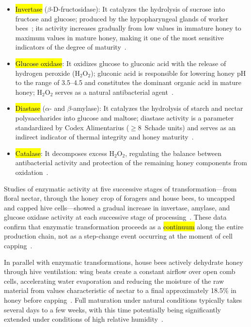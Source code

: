 \documentclass[foods,review,accept,pdftex,moreauthors]{Definitions/mdpi}
\begin{document}
\begin{itemize}
    \item \hl{Invertase} %
 ($\beta$-D-fructosidase): It catalyzes
          the hydrolysis of sucrose into fructose and glucose;
          produced by the hypopharyngeal glands of worker
          bees~\cite{biochemreactions2022};
          its activity increases gradually from low values
          in immature honey to maximum values in mature honey,
          making it one of the most sensitive indicators of
          the degree of maturity~\cite{zhang2021}.
    \item \hl{Glucose oxidase}: It oxidizes glucose to gluconic
          acid with the release of hydrogen peroxide (H$_2$O$_2$);
          gluconic acid is responsible for lowering honey pH to the
          range of 3.5--4.5 and constitutes the dominant organic
          acid in mature honey; H$_2$O$_2$ serves as a natural
          antibacterial agent~\cite{biochemreactions2022,zhang2021}.
    \item \hl{Diastase} 
 ($\alpha$- and $\beta$-amylase):
          It catalyzes the hydrolysis of starch and nectar
          polysaccharides into glucose and maltose; diastase
          activity is a parameter standardized by Codex Alimentarius
          ($\geq$$8$~Schade units) and serves as an indirect indicator
          of thermal integrity and honey
          maturity~\cite{codex_stan12,biochemreactions2022,zhang2021}.
    \item \hl{Catalase}: 
 It decomposes excess H$_2$O$_2$,
          regulating the balance between antibacterial activity
          and protection of the remaining honey components
          from oxidation~\cite{biochemreactions2022}.
\end{itemize}

Studies of enzymatic activity at five successive stages of
transformation---from floral nectar, through the honey crop of
foragers and house bees, to uncapped and capped hive cells---showed
a gradual increase in invertase, amylase, and glucose oxidase
activity at each successive stage of
processing~\cite{enzymesrole2023}. These data confirm that
enzymatic transformation proceeds as a \hl{continuum} along
the entire production chain, not as a step-change event occurring
at the moment of cell capping~\cite{enzymesrole2023,zhang2021}.

In parallel with enzymatic transformations, house bees actively
dehydrate honey through hive ventilation: wing beats create a
constant airflow over open comb cells, accelerating water
evaporation and reducing the moisture of the raw material from
values characteristic of nectar to a final approximately 18.5\%
in honey before capping~\cite{zhang2021}. Full maturation under
natural conditions typically takes several days to a few weeks,
with this time potentially being significantly extended under
conditions of high relative
\mbox{humidity~\cite{zhang2021,tadele2025}.}
\end{document}

